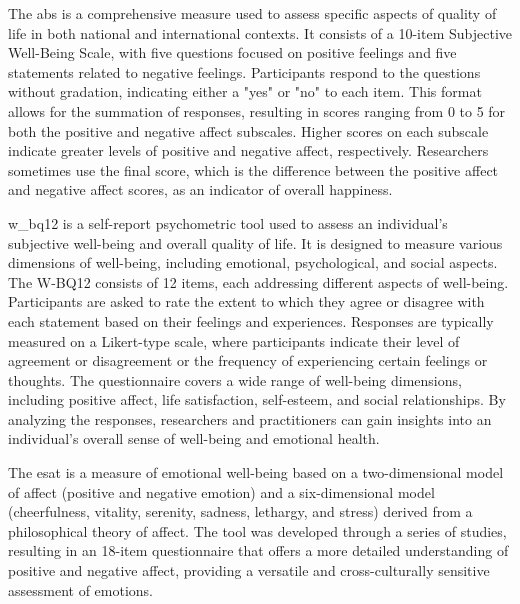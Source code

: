 \documentclass[a4paper,fleqn]{cas-sc}
\begin{document}
The \gls{abs} \cite{glatzer_affect_2014} is a comprehensive measure used to assess specific aspects of quality of life in both national and international contexts. It consists of a 10-item Subjective Well-Being Scale, with five questions focused on positive feelings and five statements related to negative feelings. Participants respond to the questions without gradation, indicating either a "yes" or "no" to each item. This format allows for the summation of responses, resulting in scores ranging from 0 to 5 for both the positive and negative affect subscales. Higher scores on each subscale indicate greater levels of positive and negative affect, respectively. Researchers sometimes use the final score, which is the difference between the positive affect and negative affect scores, as an indicator of overall happiness.

\gls{w_bq12} \cite{mitchell_psychometric_2001} is a self-report psychometric tool used to assess an individual's subjective well-being and overall quality of life. It is designed to measure various dimensions of well-being, including emotional, psychological, and social aspects. The W-BQ12 consists of 12 items, each addressing different aspects of well-being. Participants are asked to rate the extent to which they agree or disagree with each statement based on their feelings and experiences. Responses are typically measured on a Likert-type scale, where participants indicate their level of agreement or disagreement or the frequency of experiencing certain feelings or thoughts. The questionnaire covers a wide range of well-being dimensions, including positive affect, life satisfaction, self-esteem, and social relationships. By analyzing the responses, researchers and practitioners can gain insights into an individual's overall sense of well-being and emotional health.

The \gls{esat} \cite{yaden_emotional_2022} is a measure of emotional well-being based on a two-dimensional model of affect (positive and negative emotion) and a six-dimensional model (cheerfulness, vitality, serenity, sadness, lethargy, and stress) derived from a philosophical theory of affect. The tool was developed through a series of studies, resulting in an 18-item questionnaire that offers a more detailed understanding of positive and negative affect, providing a versatile and cross-culturally sensitive assessment of emotions. 
\end{document}
